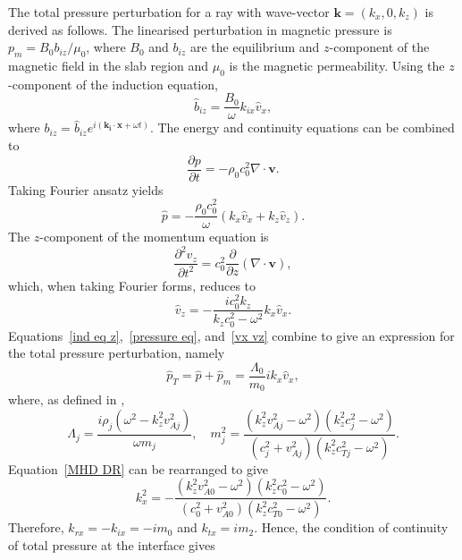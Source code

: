 \documentclass[12pt]{../style-files/ociamthesis}
\begin{document}
	The total pressure perturbation for a ray with wave-vector $\mathbf{k} = (k_x, 0, k_z)$ is derived as follows. The linearised perturbation in magnetic pressure is $p_m = B_0b_{iz}/\mu_0$, where $B_0$ and $b_{iz}$ are the equilibrium and $z$-component of the magnetic field in the slab region and $\mu_0$ is the magnetic permeability. Using the $z$-component of the induction equation,
	\begin{equation}
	\hat{b}_{iz} = \frac{B_0}{\omega}k_{ix}\hat{v}_x, \label{ind eq z}
	\end{equation}
	where $b_{iz} = \hat{b}_{iz} e^{i(\mathbf{k_i}\cdot \mathbf{x} + \omega t)}$. The energy and continuity equations can be combined to
	\begin{equation}
	\frac{\partial p}{\partial t} = - \rho_0 c_0^2 \nabla \cdot \mathbf{v}.
	\end{equation}
	Taking Fourier ansatz yields
	\begin{equation}
	\hat{p} = -\frac{\rho_0c_0^2}{\omega} (k_x\hat{v}_x + k_z\hat{v}_z). \label{pressure eq}
	\end{equation}
	The $z$-component of the momentum equation is
	\begin{equation}
	\frac{\partial^2 v_z}{\partial t^2} = c_0^2 \frac{\partial}{\partial z}(\nabla \cdot \mathbf{v}),
	\end{equation}
	which, when taking Fourier forms, reduces to
	\begin{equation}
	\hat{v}_z = - \frac{ic_0^2k_z}{k_zc_0^2 - \omega^2}k_x\hat{v}_x. \label{vx vz}
	\end{equation}
	Equations~\eqref{ind eq z},~\eqref{pressure eq}, and~\eqref{vx vz} combine to give an expression for the total pressure perturbation, namely
	\begin{equation}
	\hat{p}_T = \hat{p} + \hat{p}_m = \frac{\Lambda_0}{m_0}ik_x\hat{v}_x,
	\end{equation}
	where, as defined in \cite{all_etal17},
	\begin{equation}
	\Lambda_j = \frac{i\rho_j(\omega^2 - k_z^2v_{Aj}^2)}{\omega m_j}, \quad m_j^2 = \frac{(k_z^2 v_{Aj}^2 - \omega^2)(k_z^2 c_{j}^2 - \omega^2)}{(c_j^2 + v_{Aj}^2)(k_z^2 c_{Tj}^2 - \omega^2)}.
	\end{equation}
	Equation~\eqref{MHD DR} can be rearranged to give
	\begin{equation}
	k_x^2 = -\frac{(k_z^2 v_{A0}^2 - \omega^2)(k_z^2 c_{0}^2 - \omega^2)}{(c_0^2 + v_{A0}^2)(k_z^2 c_{T0}^2 - \omega^2)}.
	\end{equation}
	Therefore, $k_{rx} = -k_{ix} = -im_0$ and $k_{tx} = im_2$. Hence, the condition of continuity of total pressure at the interface gives
\end{document}
